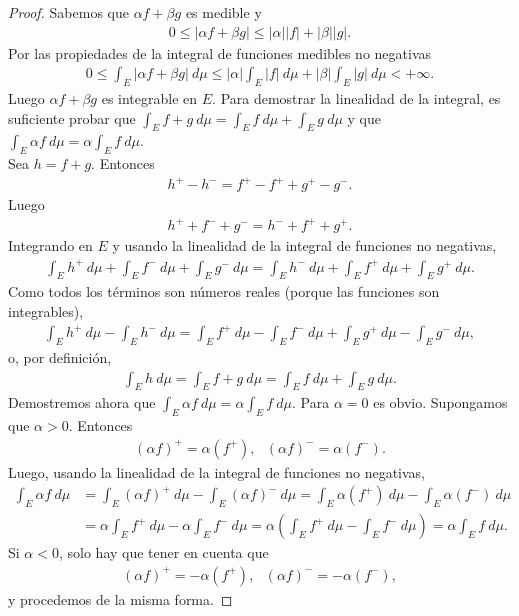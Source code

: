 \begin{proof}
Sabemos que $\alpha f + \beta g$ es medible y
\begin{align*}
    0 \leq |\alpha f + \beta g| \leq |\alpha||f| + |\beta||g|.
\end{align*}
Por las propiedades de la integral de funciones medibles no negativas
\begin{align*}
    0 \leq \int_{E}{|\alpha f + \beta g| \ d\mu} \leq |\alpha|\int_{E}{|f| \ d\mu} + |\beta|\int_{E}{|g| \ d\mu} < +\infty.
\end{align*}
Luego $\alpha f + \beta g$ es integrable en $E$. Para demostrar la linealidad de la integral, es suficiente probar que $\int_{E}{f + g \ d\mu} = \int_{E}{f \ d\mu} + \int_{E}{g \ d\mu}$ y que $\int_{E}{\alpha f \ d\mu} = \alpha\int_{E}{f \ d\mu}$.
\\
\newline
Sea $h = f + g$. Entonces
\begin{align*}
    h^+ - h^- = f^+ - f^+ + g^+ - g^-.
\end{align*}
Luego
\begin{align*}
    h^+ + f^- + g^- = h^- + f^+ + g^+.
\end{align*}
Integrando en $E$ y usando la linealidad de la integral de funciones no negativas,
\begin{align*}
    \int_{E}{h^+ \ d\mu} + \int_{E}{f^- \ d\mu} + \int_{E}{g^- \ d\mu} = \int_{E}{h^- \ d\mu} + \int_{E}{f^+ \ d\mu} + \int_{E}{g^+ \ d\mu}.
\end{align*}
Como todos los términos son números reales (porque las funciones son integrables),
\begin{align*}
    \int_{E}{h^+ \ d\mu} - \int_{E}{h^- \ d\mu} = \int_{E}{f^+ \ d\mu} - \int_{E}{f^- \ d\mu} + \int_{E}{g^+ \ d\mu} - \int_{E}{g^- \ d\mu},
\end{align*}
o, por definición,
\begin{align*}
    \int_{E}{h \ d\mu} = \int_{E}{f + g \ d\mu} = \int_{E}{f \ d\mu} + \int_{E}{g \ d\mu}.
\end{align*}
Demostremos ahora que $\int_{E}{\alpha f \ d\mu} = \alpha\int_{E}{f \ d\mu}$. Para $\alpha = 0$ es obvio. Supongamos que $\alpha > 0$. Entonces
\begin{align*}
    (\alpha f)^+ = \alpha(f^+), \ \ \ (\alpha f)^- = \alpha(f^-).
\end{align*}
Luego, usando la linealidad de la integral de funciones no negativas,
\begin{align*}
    \int_{E}{\alpha f \ d\mu} &= \int_{E}{(\alpha f)^+ \ d\mu} - \int_{E}{(\alpha f)^- \ d\mu} = \int_{E}{\alpha (f^+) \ d\mu} - \int_{E}{\alpha (f^-) \ d\mu}\\
    &= \alpha\int_{E}{f^+ \ d\mu} - \alpha\int_{E}{f^- \ d\mu} = \alpha\left( \int_{E}{f^+ \ d\mu} - \int_{E}{f^- \ d\mu}\right) = \alpha\int_{E}{f \ d\mu}.
\end{align*}
Si $\alpha < 0$, solo hay que tener en cuenta que
\begin{align*}
    (\alpha f)^+ = -\alpha(f^+), \ \ \ (\alpha f)^- = -\alpha(f^-),
\end{align*}
y procedemos de la misma forma.
\end{proof}

